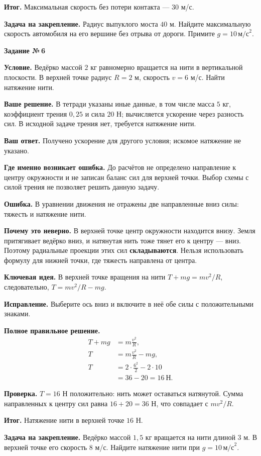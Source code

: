 \documentclass[a4paper,11pt]{article}
\newcommand{\keyidea}{\textcolor{accent}{\textbf{Ключевая идея.}}}
\newcommand{\mistake}{\textcolor{error}{\textbf{Ошибка.}}}
\newcommand{\result}{\textcolor{accent}{\textbf{Итог.}}}
\newcommand{\taskhead}[1]{\phantomsection\label{task:#1}\begin{center}{\Large\bfseries\color{ink}Задание №\,#1}\end{center}\vspace{3pt}}
\newcommand{\field}[1]{\par\vspace{2pt}\textbf{#1}\quad}
\begin{document}
\result{} Максимальная скорость без потери контакта --- $30$ м/с.

\field{Задача на закрепление.} Радиус выпуклого моста $40$ м. Найдите максимальную скорость автомобиля на его вершине без отрыва от дороги. Примите $g=10\,\text{м/с}^2$.
\clearpage

\taskhead{6}
\field{Условие.} Ведёрко массой $2$ кг равномерно вращается на нити в вертикальной плоскости. В верхней точке радиус $R=2$ м, скорость $v=6$ м/с. Найти натяжение нити.

\field{Ваше решение.} В тетради указаны иные данные, в том числе масса $5$ кг, коэффициент трения $0{,}25$ и сила $20$ Н; вычисляется ускорение через разность сил. В исходной задаче трения нет, требуется натяжение нити.

\field{Ваш ответ.} Получено ускорение для другого условия; искомое натяжение не указано.

\field{Где именно возникает ошибка.} До расчётов не определено направление к центру окружности и не записан баланс сил для верхней точки. Выбор схемы с силой трения не позволяет решить данную задачу.

\mistake{} В уравнении движения не отражены две направленные вниз силы: тяжесть и натяжение нити.

\field{Почему это неверно.} В верхней точке центр окружности находится внизу. Земля притягивает ведёрко вниз, и натянутая нить тоже тянет его к центру --- вниз. Поэтому радиальные проекции этих сил \textbf{складываются}. Нельзя использовать формулу для нижней точки, где тяжесть направлена от центра.

\keyidea{} В верхней точке вращения на нити $T+mg=mv^2/R$, следовательно, $T=mv^2/R-mg$.

\field{Исправление.} Выберите ось вниз и включите в неё обе силы с положительными знаками.

\field{Полное правильное решение.}
\begin{align*}
T+mg&=m\frac{v^2}{R},\\
T&=m\frac{v^2}{R}-mg,\\
T&=2\cdot\frac{6^2}{2}-2\cdot10\\
 &=36-20=\boxed{16\ \text{Н}}.
\end{align*}
\field{Проверка.} $T=16$ Н положительно: нить может оставаться натянутой. Сумма направленных к центру сил равна $16+20=36$ Н, что совпадает с $mv^2/R$.

\result{} Натяжение нити в верхней точке $16$ Н.

\field{Задача на закрепление.} Ведёрко массой $1{,}5$ кг вращается на нити длиной $3$ м. В верхней точке его скорость $8$ м/с. Найдите натяжение нити при $g=10\,\text{м/с}^2$.
\clearpage
\end{document}

